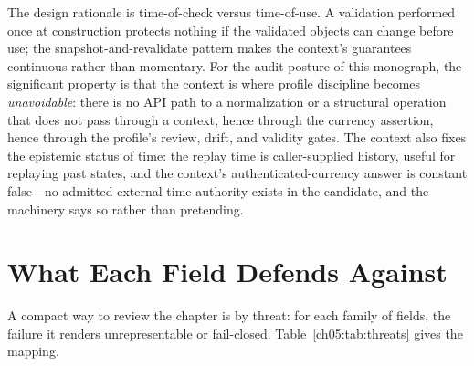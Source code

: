 The design rationale is time-of-check versus time-of-use. A validation
performed once at construction protects nothing if the validated objects can
change before use; the snapshot-and-revalidate pattern makes the context's
guarantees continuous rather than momentary. For the audit posture of this
monograph, the significant property is that the context is where profile
discipline becomes \emph{unavoidable}: there is no API path to a
normalization or a structural operation that does not pass through a
context, hence through the currency assertion, hence through the profile's
review, drift, and validity gates. The context also fixes the epistemic
status of time: the replay time is caller-supplied history, useful for
replaying past states, and the context's authenticated-currency answer is
constant false---no admitted external time authority exists in the
candidate, and the machinery says so rather than pretending.

\section{What Each Field Defends Against}\label{ch05:threats}

A compact way to review the chapter is by threat: for each family of
fields, the failure it renders unrepresentable or fail-closed.
Table~\ref{ch05:tab:threats} gives the mapping.

